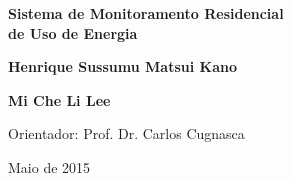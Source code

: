 \begin{titlepage}

\begin{center}

\small


\vfill

\LARGE

\textbf{Sistema de Monitoramento Residencial\\ 
de Uso de Energia}

\vfill

\large

\textbf{Henrique Sussumu Matsui Kano}

\textbf{Mi Che Li Lee}

\vfill

\normalsize

Orientador: Prof. Dr. Carlos Cugnasca

\vfill

\vfill

\large

Maio de 2015

\end{center}

\end{titlepage}